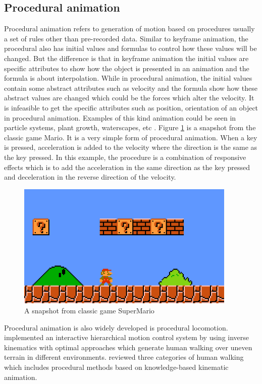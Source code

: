 \subsection{Procedural animation}
Procedural animation refers to generation of motion based on procedures usually a set of rules other than pre-recorded data. Similar to keyframe animation, the procedural also has initial values and formulas to control how these values will be changed. But the difference is that in keyframe animation the initial values are specific attributes to show how the object is presented in an animation and the formula is about interpolation. While in procedural animation, the initial values contain some abstract attributes such as velocity and the formula show how these abstract values are changed which could be the forces which alter the velocity. It is infeasible to get the specific attributes such as position, orientation of an object in procedural animation. Examples of this kind animation could be seen in particle systems, plant growth, waterscapes, etc \cite{vince3D}.
Figure \ref{fig:mario} is a snapshot from the classic game Mario. It is a very simple form of procedural animation. When a key is pressed, acceleration is added to the velocity where the direction is the same as the key pressed. In this example, the procedure is a combination of responsive effects which is to add the acceleration in the same direction as the key pressed and deceleration in the reverse direction of the velocity. 
\begin{figure}[ht!]
\centering
\includegraphics[height=6cm]{figures/mario.png}
\caption{A snapshot from classic game SuperMario}
\label{fig:mario}
\end{figure}
 Procedural animation is also widely developed is procedural
locomotion.\cite{loco1} implemented an interactive hierarchical motion control
system by using inverse kinematics with optimal approaches which
generate human walking over uneven terrain in different
environments. \cite{loco2} reviewed three categories of human walking which
includes procedural methods based on knowledge-based kinematic
animation.

